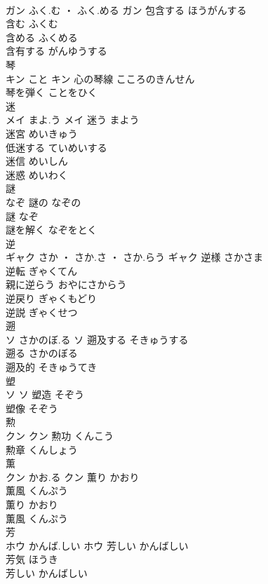 \documentclass[8pt]{extreport}
\begin{document}
\begin{CJK}{UTF8}{min}
\\	ガン	ふく.む ・ ふく.める	ガン	包含する	ほうがんする	
\\	含む	ふくむ	
\\	含める	ふくめる	
\\	含有する	がんゆうする	
\\	琴	
\\	キン	こと	キン	心の琴線	こころのきんせん	
\\	琴を弾く	ことをひく	
\\	迷	
\\	メイ	まよ.う	メイ	迷う	まよう	
\\	迷宮	めいきゅう	
\\	低迷する	ていめいする	
\\	迷信	めいしん	
\\	迷惑	めいわく	
\\	謎	
\\	なぞ		謎の	なぞの	
\\	謎	なぞ	
\\	謎を解く	なぞをとく	
\\	逆	
\\	ギャク	さか ・ さか.さ ・ さか.らう	ギャク	逆様	さかさま	
\\	逆転	ぎゃくてん	
\\	親に逆らう	おやにさからう	
\\	逆戻り	ぎゃくもどり	
\\	逆説	ぎゃくせつ	
\\	遡	
\\	ソ	さかのぼ.る	ソ	遡及する	そきゅうする	
\\	遡る	さかのぼる	
\\	遡及的	そきゅうてき	
\\	塑	
\\	ソ		ソ	塑造	そぞう	
\\	塑像	そぞう	
\\	勲	
\\	クン		クン	勲功	くんこう	
\\	勲章	くんしょう	
\\	薫	
\\	クン	かお.る	クン	薫り	かおり	
\\	薫風	くんぷう	
\\	薫り	かおり	
\\	薫風	くんぷう	
\\	芳	
\\	ホウ	かんば.しい	ホウ	芳しい	かんばしい	
\\	芳気	ほうき	
\\	芳しい	かんばしい	

\end{CJK}
\end{document}
